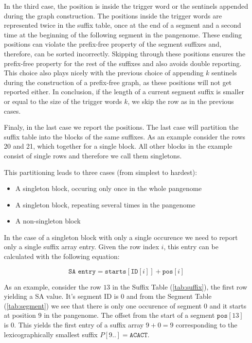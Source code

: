 In the third case, the position is inside the trigger word or the sentinels appended during the graph construction.
The positions inside the trigger words are represented twice in the suffix table, once at the end of a segment and a second time at the beginning of the following segment in the pangenome.
These ending positions can violate the prefix-free property of the segment suffixes and, therefore, can be sorted incorrectly.
Skipping through these positions ensures the prefix-free property for the rest of the suffixes and also avoids double reporting.
This choice also plays nicely with the previous choice of appending $k$ sentinels during the construction of a prefix-free graph, as these positions will not get reported either.
In conclusion, if the length of a current segment suffix is smaller or equal to the size of the trigger words $k$, we skip the row as in the previous cases.

Finaly, in the last case we report the positions.
The last case will partition the suffix table into the blocks of the same suffixes.
As an example consider the rows 20 and 21, which together for a single block.
All other blocks in the example consist of single rows and therefore we call them singletons.

This partitioning leads to three cases (from simplest to hardest):
\begin{itemize}
    \item A singleton block, occuring only once in the whole pangenome
    \item A singleton block, repeating several times in the pangenome
    \item A non-singleton block
\end{itemize}

In the case of a singleton block with only a single occurence we need to report only a single suffix array entry.
Given the row index $i$, this entry can be calculated with the following equation:

\begin{equation}
    \label{eq:sa_entry}
    \texttt{SA entry} = \texttt{starts}[\texttt{ID}[i]] + \texttt{pos}[i]
\end{equation}

As an example, consider the row $13$ in the Suffix Table (\ref{tab:suffix}), the first row yielding a SA value.
It's segment ID is $0$ and from the Segment Table (\ref{tab:segment}) we see that there is only one occurence of segment $0$ and it starts at position $9$ in the pangenome.
The offset from the start of a segment $\texttt{pos}[13]$ is $0$.
This yields the first entry of a suffix array $9 + 0 = 9$ corresponding to the lexicographically smallest suffix $P[9..] = \texttt{ACACT}$.

